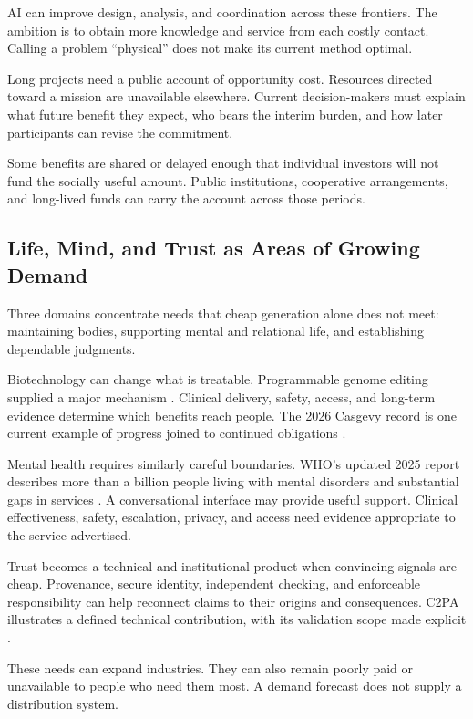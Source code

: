 \documentclass[11pt,openany]{book}
\begin{document}
AI can improve design, analysis, and coordination across these frontiers. The ambition is to obtain more knowledge and service from each costly contact. Calling a problem “physical” does not make its current method optimal.

Long projects need a public account of opportunity cost. Resources directed toward a mission are unavailable elsewhere. Current decision-makers must explain what future benefit they expect, who bears the interim burden, and how later participants can revise the commitment.

Some benefits are shared or delayed enough that individual investors will not fund the socially useful amount. Public institutions, cooperative arrangements, and long-lived funds can carry the account across those periods.

\subsection{Life, Mind, and Trust as Areas of Growing Demand}

Three domains concentrate needs that cheap generation alone does not meet: maintaining bodies, supporting mental and relational life, and establishing dependable judgments.

Biotechnology can change what is treatable. Programmable genome editing supplied a major mechanism \cite{jinek2012programmable}. Clinical delivery, safety, access, and long-term evidence determine which benefits reach people. The 2026 Casgevy record is one current example of progress joined to continued obligations \cite{fda2026casgevy}.

Mental health requires similarly careful boundaries. WHO's updated 2025 report describes more than a billion people living with mental disorders and substantial gaps in services \cite{who2025mental}. A conversational interface may provide useful support. Clinical effectiveness, safety, escalation, privacy, and access need evidence appropriate to the service advertised.

Trust becomes a technical and institutional product when convincing signals are cheap. Provenance, secure identity, independent checking, and enforceable responsibility can help reconnect claims to their origins and consequences. C2PA illustrates a defined technical contribution, with its validation scope made explicit \cite{c2pa2026spec}.

These needs can expand industries. They can also remain poorly paid or unavailable to people who need them most. A demand forecast does not supply a distribution system.
\end{document}
